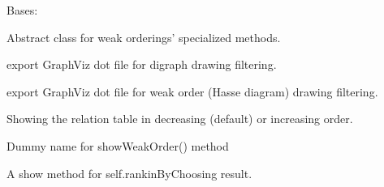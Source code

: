 \documentclass[letterpaper,10pt,english]{sphinxmanual}
\begin{document}
\begin{fulllineitems}
\label{techDoc:weakOrders.WeakOrder}
Bases: {\hyperref[techDoc:digraphs.Digraph]{}}

Abstract class for weak orderings' specialized methods.

\begin{fulllineitems}
\label{techDoc:weakOrders.WeakOrder.exportDigraphGraphViz}
export GraphViz dot file for digraph drawing filtering.

\end{fulllineitems}


\begin{fulllineitems}
\label{techDoc:weakOrders.WeakOrder.exportGraphViz}
export GraphViz dot file for weak order (Hasse diagram) drawing filtering.

\end{fulllineitems}


\begin{fulllineitems}
\label{techDoc:weakOrders.WeakOrder.showOrderedRelationTable}
Showing the relation table in decreasing (default) or increasing order.

\end{fulllineitems}


\begin{fulllineitems}
\label{techDoc:weakOrders.WeakOrder.showRankingByChoosing}
Dummy name for showWeakOrder() method

\end{fulllineitems}


\begin{fulllineitems}
\label{techDoc:weakOrders.WeakOrder.showWeakOrder}
A show method for self.rankinByChoosing result.

\end{fulllineitems}


\end{fulllineitems}
\end{document}
